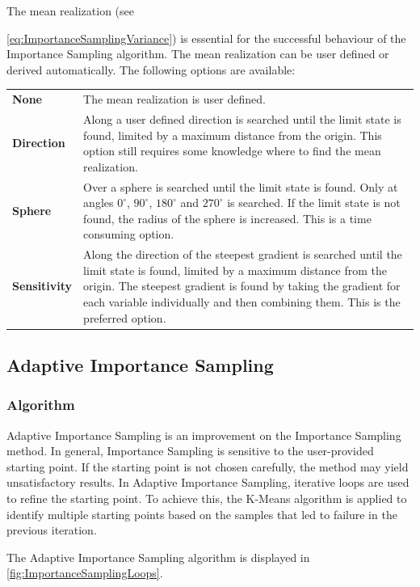 The mean realization (see {\autoref{eq:ImportanceSamplingVariance}) is essential for the successful behaviour of the Importance Sampling algorithm. The mean realization can be user defined or derived automatically. The following options are available:
	
\begin{longtable}{p{16mm}p{\textwidth-24pt-16mm}}  
	\textbf{None} & The mean realization is user defined. \\
	\textbf{Direction} & Along a user defined direction is searched until the limit state is found, limited by a maximum distance from the origin. This option still requires some knowledge where to find the mean realization.  \\
	\textbf{Sphere} & Over a sphere is searched until the limit state is found. Only at angles $0^\circ$, $90^\circ$, $180^\circ$ and $270^\circ$ is searched. If the limit state is not found, the radius of the sphere is increased. This is a time consuming option. \\  
	\textbf{Sensitivity} & Along the direction of the steepest gradient is searched until the limit state is found, limited by a maximum distance from the origin. The steepest gradient is found by taking the gradient for each variable individually and then combining them. This is the preferred option. \\  
\end{longtable}

\subsection{Adaptive Importance Sampling}
\label{sec:AdaptiveImportanceSampling}

\subsubsection{Algorithm}

Adaptive Importance Sampling is an improvement on the Importance Sampling method. In general, Importance Sampling is sensitive to the user-provided starting point. If the starting point is not chosen carefully, the method may yield unsatisfactory results. In Adaptive Importance Sampling, iterative loops are used to refine the starting point. To achieve this, the K-Means algorithm is applied to identify multiple starting points based on the samples that led to failure in the previous iteration.

The Adaptive Importance Sampling algorithm is displayed in \autoref{fig:ImportanceSamplingLoops}.

}
